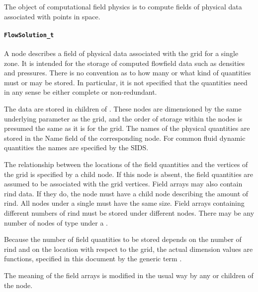 The object of computational field physics is to compute fields
of physical data associated with points in space.

\paragraph{\texttt{FlowSolution\_t}}

A  node describes a field of physical data
associated with the grid for a single zone. It is intended for
the storage of computed flowfield data such as densities and
pressures. There is no convention as to how many or what kind
of quantities must or may be stored. In particular, it is not
specified that the quantities need in any sense be either complete or
non-redundant.

The data are stored in  children of
. These  nodes are dimensioned
by the same underlying  parameter as the grid, and
the order of storage within the  nodes is presumed
the same as it is for the grid. The names of the physical quantities are
stored in the Name field of the corresponding 
node. For common fluid dynamic quantities the names are specified by the
SIDS.

The relationship between the locations of the field quantities and the
vertices of the grid is specified by a  child
node. If this node is absent, the field quantities are assumed to be
associated with the grid vertices. Field arrays
may also contain rind data. If they do, the  node
must have a  child node describing the amount of rind. All
 nodes under a single  must
have the same size. Field arrays containing different numbers of rind
must be stored under different  nodes. There
may be any number of nodes of type  under a
.

Because the number of field quantities to be stored depends on the
number of rind and on the location with respect to the grid, the actual
dimension values are functions, specified in this document by the
generic term .

The meaning of the field arrays is modified in the usual way by any
 or  children of the
 node.

